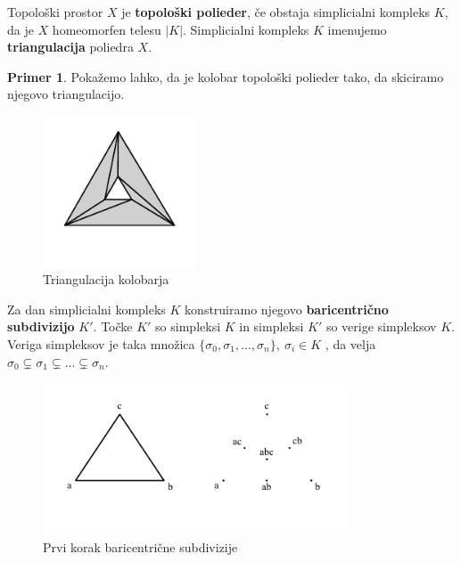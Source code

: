 \documentclass[a4paper, 12pt]{book}
\theoremstyle{definition}
\newtheorem{example}{Primer}[section]
\begin{document}
\newpage
Topološki prostor $X$ je \textbf{topološki polieder}, če obstaja simplicialni
kompleks $K$, da je $X$ homeomorfen telesu $|K|$. Simplicialni kompleks
$K$ imenujemo \textbf{triangulacija} poliedra $X$.
\begin{example}
  Pokažemo lahko, da je kolobar topološki polieder tako, da skiciramo njegovo
  triangulacijo.
    \begin{figure}[h]
        \begin{center}
        \includegraphics[width=0.4\textwidth]{torus-simpleks.pdf}
        \end{center}
        \caption{Triangulacija kolobarja}
    \end{figure}
\end{example}
Za dan simplicialni kompleks $K$ konstruiramo njegovo \textbf{baricentrično subdivizijo} $K'$.
Točke $K'$ so simpleksi $K$ in simpleksi $K'$ so verige simpleksov $K$. Veriga
simpleksov je taka množica $\{\sigma_0,\sigma_1,\dots,\sigma_n\},\ \sigma_i \in K$
, da velja $\sigma_0 \subsetneq \sigma_1 \subsetneq \dots \subsetneq \sigma_n$.
\newpage
\begin{figure}[h]
  \begin{center}
  \includegraphics[width=0.8\textwidth]{baricentricna1.pdf}
  \end{center}
  \caption{Prvi korak baricentrične subdivizije}
  \label{baricent1}
\end{figure}
\end{document}
